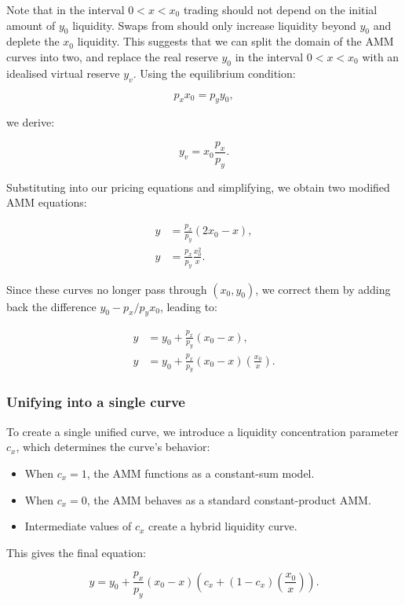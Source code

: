 \documentclass{article}
\begin{document}
Note that in the interval $0 < x < x_0$ trading should not depend on the initial amount of $y_0$ liquidity. Swaps from should only increase liquidity beyond $y_0$ and deplete the $x_0$ liquidity. This suggests that we can split the domain of the AMM curves into two, and replace the real reserve $y_0$ in the interval $0 < x < x_0$ with an idealised virtual reserve $y_v$. Using the equilibrium condition:

\[
p_x x_0 = p_y y_0,
\]

we derive:

\[
y_v = x_0 \frac{p_x}{p_y}.
\]

Substituting into our pricing equations and simplifying, we obtain two modified AMM equations:

\begin{align}
    y &= \frac{p_x}{p_y} (2x_0 - x), \\
    y &= \frac{p_x}{p_y} \frac{x_0^2}{x}.
\end{align}

Since these curves no longer pass through \( (x_0, y_0) \), we correct them by adding back the difference \( y_0 - p_x / p_y x_0 \), leading to:

\begin{align}
    y &= y_0 + \frac{p_x}{p_y} (x_0 - x), \\
    y &= y_0 + \frac{p_x}{p_y} (x_0 - x) \left( \frac{x_0}{x} \right).
\end{align}

\subsubsection{Unifying into a single curve}

To create a single unified curve, we introduce a liquidity concentration parameter \( c_x \), which determines the curve’s behavior:

\begin{itemize}
    \item When \( c_x = 1 \), the AMM functions as a constant-sum model.
    \item When \( c_x = 0 \), the AMM behaves as a standard constant-product AMM.
    \item Intermediate values of \( c_x \) create a hybrid liquidity curve.
\end{itemize}

This gives the final equation:

\begin{equation}
    \label{eq:maglev-1}
    y = y_0 + \frac{p_x}{p_y} (x_0 - x) \left( c_x + (1 - c_x) \left(\frac{x_0}{x}\right) \right).
\end{equation}
\end{document}
